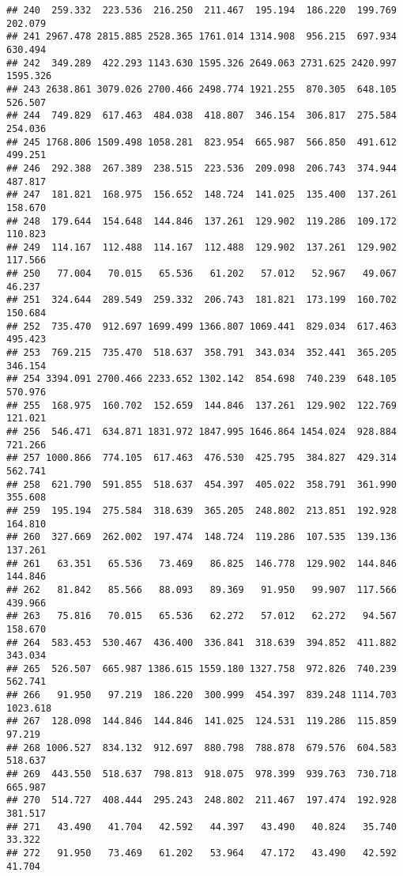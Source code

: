 \documentclass[
]{article}
\begin{document}
\begin{verbatim}
## 240  259.332  223.536  216.250  211.467  195.194  186.220  199.769  202.079
## 241 2967.478 2815.885 2528.365 1761.014 1314.908  956.215  697.934  630.494
## 242  349.289  422.293 1143.630 1595.326 2649.063 2731.625 2420.997 1595.326
## 243 2638.861 3079.026 2700.466 2498.774 1921.255  870.305  648.105  526.507
## 244  749.829  617.463  484.038  418.807  346.154  306.817  275.584  254.036
## 245 1768.806 1509.498 1058.281  823.954  665.987  566.850  491.612  499.251
## 246  292.388  267.389  238.515  223.536  209.098  206.743  374.944  487.817
## 247  181.821  168.975  156.652  148.724  141.025  135.400  137.261  158.670
## 248  179.644  154.648  144.846  137.261  129.902  119.286  109.172  110.823
## 249  114.167  112.488  114.167  112.488  129.902  137.261  129.902  117.566
## 250   77.004   70.015   65.536   61.202   57.012   52.967   49.067   46.237
## 251  324.644  289.549  259.332  206.743  181.821  173.199  160.702  150.684
## 252  735.470  912.697 1699.499 1366.807 1069.441  829.034  617.463  495.423
## 253  769.215  735.470  518.637  358.791  343.034  352.441  365.205  346.154
## 254 3394.091 2700.466 2233.652 1302.142  854.698  740.239  648.105  570.976
## 255  168.975  160.702  152.659  144.846  137.261  129.902  122.769  121.021
## 256  546.471  634.871 1831.972 1847.995 1646.864 1454.024  928.884  721.266
## 257 1000.866  774.105  617.463  476.530  425.795  384.827  429.314  562.741
## 258  621.790  591.855  518.637  454.397  405.022  358.791  361.990  355.608
## 259  195.194  275.584  318.639  365.205  248.802  213.851  192.928  164.810
## 260  327.669  262.002  197.474  148.724  119.286  107.535  139.136  137.261
## 261   63.351   65.536   73.469   86.825  146.778  129.902  144.846  144.846
## 262   81.842   85.566   88.093   89.369   91.950   99.907  117.566  439.966
## 263   75.816   70.015   65.536   62.272   57.012   62.272   94.567  158.670
## 264  583.453  530.467  436.400  336.841  318.639  394.852  411.882  343.034
## 265  526.507  665.987 1386.615 1559.180 1327.758  972.826  740.239  562.741
## 266   91.950   97.219  186.220  300.999  454.397  839.248 1114.703 1023.618
## 267  128.098  144.846  144.846  141.025  124.531  119.286  115.859   97.219
## 268 1006.527  834.132  912.697  880.798  788.878  679.576  604.583  518.637
## 269  443.550  518.637  798.813  918.075  978.399  939.763  730.718  665.987
## 270  514.727  408.444  295.243  248.802  211.467  197.474  192.928  381.517
## 271   43.490   41.704   42.592   44.397   43.490   40.824   35.740   33.322
## 272   91.950   73.469   61.202   53.964   47.172   43.490   42.592   41.704

\end{verbatim}
\end{document}
